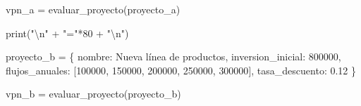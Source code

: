 \documentclass[
  doc,
  floatsintext,
  longtable,
  a4paper,
  nolmodern,
  notxfonts,
  notimes,
  12pt,
  colorlinks=true,linkcolor=blue,citecolor=blue,urlcolor=blue]{apa7}
\newenvironment{Shaded}{\begin{snugshade}}{\end{snugshade}}
\newcommand{\BuiltInTok}[1]{\textcolor[rgb]{0.00,0.23,0.31}{#1}}
\newcommand{\CharTok}[1]{\textcolor[rgb]{0.13,0.47,0.30}{#1}}
\newcommand{\DecValTok}[1]{\textcolor[rgb]{0.68,0.00,0.00}{#1}}
\newcommand{\FloatTok}[1]{\textcolor[rgb]{0.68,0.00,0.00}{#1}}
\newcommand{\NormalTok}[1]{\textcolor[rgb]{0.00,0.23,0.31}{#1}}
\newcommand{\OperatorTok}[1]{\textcolor[rgb]{0.37,0.37,0.37}{#1}}
\newcommand{\StringTok}[1]{\textcolor[rgb]{0.13,0.47,0.30}{#1}}
\begin{document}
\begin{Shaded}
\begin{Highlighting}[]
\NormalTok{vpn\_a }\OperatorTok{=}\NormalTok{ evaluar\_proyecto(proyecto\_a)}

\BuiltInTok{print}\NormalTok{(}\StringTok{"}\CharTok{\textbackslash{}n}\StringTok{"} \OperatorTok{+} \StringTok{"="}\OperatorTok{*}\DecValTok{80} \OperatorTok{+} \StringTok{"}\CharTok{\textbackslash{}n}\StringTok{"}\NormalTok{)}

\NormalTok{proyecto\_b }\OperatorTok{=}\NormalTok{ \{}
    \StringTok{\textquotesingle{}nombre\textquotesingle{}}\NormalTok{: }\StringTok{\textquotesingle{}Nueva línea de productos\textquotesingle{}}\NormalTok{,}
    \StringTok{\textquotesingle{}inversion\_inicial\textquotesingle{}}\NormalTok{: }\DecValTok{800000}\NormalTok{,}
    \StringTok{\textquotesingle{}flujos\_anuales\textquotesingle{}}\NormalTok{: [}\DecValTok{100000}\NormalTok{, }\DecValTok{150000}\NormalTok{, }\DecValTok{200000}\NormalTok{, }\DecValTok{250000}\NormalTok{, }\DecValTok{300000}\NormalTok{],}
    \StringTok{\textquotesingle{}tasa\_descuento\textquotesingle{}}\NormalTok{: }\FloatTok{0.12}
\NormalTok{\}}

\NormalTok{vpn\_b }\OperatorTok{=}\NormalTok{ evaluar\_proyecto(proyecto\_b)}
\end{Highlighting}
\end{Shaded}
\end{document}
